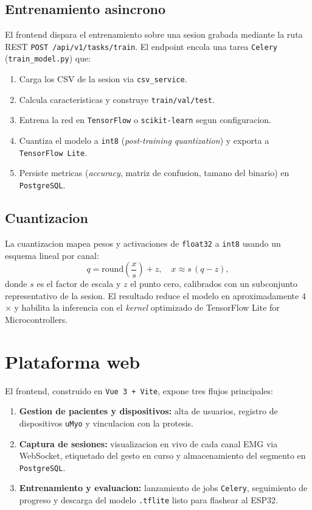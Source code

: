 \documentclass[11pt,a4paper]{article}
\begin{document}
\subsection{Entrenamiento asincrono}
El frontend dispara el entrenamiento sobre una sesion grabada
mediante la ruta REST \texttt{POST /api/v1/tasks/train}. El
endpoint encola una tarea \texttt{Celery} (\texttt{train\_model.py})
que:

\begin{enumerate}
  \item Carga los CSV de la sesion via \texttt{csv\_service}.
  \item Calcula caracteristicas y construye \texttt{train/val/test}.
  \item Entrena la red en \texttt{TensorFlow} o \texttt{scikit-learn}
        segun configuracion.
  \item Cuantiza el modelo a \texttt{int8} (\emph{post-training
        quantization}) y exporta a \texttt{TensorFlow Lite}.
  \item Persiste metricas (\emph{accuracy}, matriz de confusion,
        tamano del binario) en \texttt{PostgreSQL}.
\end{enumerate}

\subsection{Cuantizacion}
La cuantizacion mapea pesos y activaciones de \texttt{float32} a
\texttt{int8} usando un esquema lineal por canal:
\[
q = \mathrm{round}\!\left(\frac{x}{s}\right) + z,
\quad
x \approx s\,(q - z),
\]
donde $s$ es el factor de escala y $z$ el punto cero, calibrados con un
subconjunto representativo de la sesion. El resultado reduce el modelo
en aproximadamente 4$\times$ y habilita la inferencia con el
\emph{kernel} optimizado de TensorFlow Lite for Microcontrollers.

\section{Plataforma web}
\label{sec:web}

El frontend, construido en \texttt{Vue 3 + Vite}, expone tres flujos
principales:

\begin{enumerate}
  \item \textbf{Gestion de pacientes y dispositivos:} alta de usuarios,
        registro de dispositivos \texttt{uMyo} y vinculacion con la
        protesis.
  \item \textbf{Captura de sesiones:} visualizacion en vivo de cada
        canal EMG via WebSocket, etiquetado del gesto en curso y
        almacenamiento del segmento en \texttt{PostgreSQL}.
  \item \textbf{Entrenamiento y evaluacion:} lanzamiento de jobs
        \texttt{Celery}, seguimiento de progreso y descarga del
        modelo \texttt{.tflite} listo para flashear al ESP32.
\end{enumerate}
\end{document}
